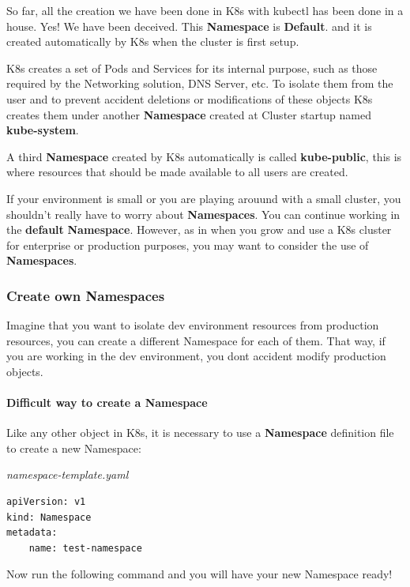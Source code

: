 \documentclass{article}
\newenvironment{codetemplate}[1][]{%
  \mybasecolorbox[#1]
  \itshape
}{%
  \endmybasecolorbox
}
\begin{document}
So far, all the creation we have been done in K8s with kubectl has been done in a house. Yes! We have been deceived. This \textbf{Namespace} is \textbf{Default}. and it is created automatically by K8s when the cluster is first setup. 

K8s creates a set of Pods and Services for its internal purpose, such as those required by the Networking solution, DNS Server, etc. To isolate them from the user and to prevent accident deletions or modifications of these objects K8s creates them under another \textbf{Namespace} created at Cluster startup named \textbf{kube-system}.

A third \textbf{Namespace} created by K8s automatically is called \textbf{kube-public}, this is where resources that should be made available to all users are created.

If your environment is small or you are playing arouund with a small cluster, you shouldn't really have to worry about \textbf{Namespaces}. You can continue working in the \textbf{default} \textbf{Namespace}. However, as in when you grow and use a K8s cluster for enterprise or production purposes, you may want to consider the use of \textbf{Namespaces}.

\subsubsection{Create own Namespaces}

Imagine that you want to isolate dev environment resources from production resources, you can create a different Namespace for each of them. That way, if you are working in the dev environment, you dont accident modify production objects.

\paragraph{Difficult way to create a Namespace}

Like any other object in K8s, it is necessary to use a \textbf{Namespace} definition file to create a new Namespace:

\begin{codetemplate}{namespace-template.yaml}
\begin{verbatim}
apiVersion: v1
kind: Namespace
metadata:
    name: test-namespace
\end{verbatim}
\end{codetemplate}

Now run the following command and you will have your new Namespace ready!
\end{document}
